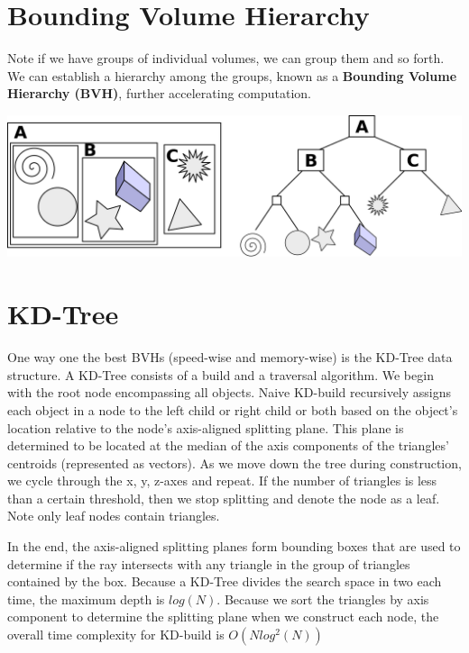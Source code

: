 \documentclass{article}
\begin{document}
\section{Bounding Volume Hierarchy}
Note if we have groups of individual volumes, we can group them and so forth. We can establish a hierarchy among the groups, known as a \textbf{Bounding Volume Hierarchy (BVH)}, further accelerating computation.

\begin{center}
\includegraphics[width=14cm]{bvh.png}
\end{center}

\section{KD-Tree}
One way one the best BVHs (speed-wise and memory-wise) is the KD-Tree data structure. A KD-Tree consists of a build and a traversal algorithm. We begin with the root node encompassing all objects. Naive KD-build recursively assigns each object in a node to the left child or right child or both based on the object's location relative to the node's axis-aligned splitting plane. This plane is determined to be located at the median of the axis components of the triangles' centroids (represented as vectors). As we move down the tree during construction, we cycle through the x, y, z-axes and repeat. If the number of triangles is less than a certain threshold, then we stop splitting and denote the node as a leaf. Note only leaf nodes contain triangles. 

In the end, the axis-aligned splitting planes form bounding boxes that are used to determine if the ray intersects with any triangle in the group of triangles contained by the box. Because a KD-Tree divides the search space in two each time, the maximum depth is $log(N)$. Because we sort the triangles by axis component to determine the splitting plane when we construct each node, the overall time complexity for KD-build is $O(Nlog^2(N))$
\end{document}
